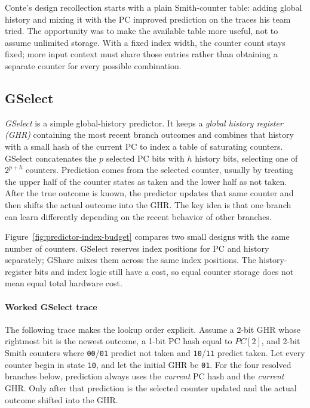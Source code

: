 Conte's design recollection starts with a plain Smith-counter table: adding global history and mixing it with the PC improved prediction on the traces his team tried.
The opportunity was to make the available table more useful, not to assume unlimited storage.
With a fixed index width, the counter count stays fixed; more input context must share those entries rather than obtaining a separate counter for every possible combination.

\subsection{GSelect}\label{subsec:auto-010a}
\textit{GSelect} is a simple global-history predictor.
It keeps a \textit{global history register (GHR)} containing the most recent branch outcomes and combines that history with a small hash of the current PC to index a table of saturating counters.
GSelect concatenates the $p$ selected PC bits with $h$ history bits, selecting one of $2^{p+h}$ counters.
Prediction comes from the selected counter, usually by treating the upper half of the counter states as taken and the lower half as not taken.
After the true outcome is known, the predictor updates that same counter and then shifts the actual outcome into the GHR\@.
The key idea is that one branch can learn differently depending on the recent behavior of other branches.

Figure~\ref{fig:predictor-index-budget} compares two small designs with the same number of counters.
GSelect reserves index positions for PC and history separately; GShare mixes them across the same index positions.
The history-register bits and index logic still have a cost, so equal counter storage does not mean equal total hardware cost.



\paragraph{Worked GSelect trace}\label{par:pipe-gselect-worked}
The following trace makes the lookup order explicit.
Assume a 2-bit GHR whose rightmost bit is the newest outcome, a 1-bit PC hash equal to $PC[2]$, and 2-bit Smith counters where \texttt{00}/\texttt{01} predict not taken and \texttt{10}/\texttt{11} predict taken.
Let every counter begin in state \texttt{10}, and let the initial GHR be \texttt{01}.
For the four resolved branches below, prediction always uses the \emph{current} PC hash and the \emph{current} GHR\@.
Only after that prediction is the selected counter updated and the actual outcome shifted into the GHR\@.

